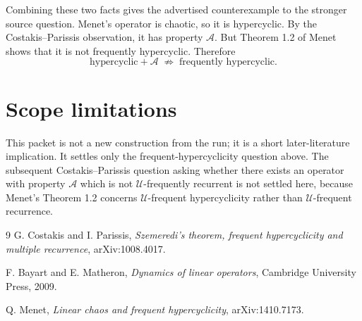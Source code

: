 \documentclass[11pt]{article}
\begin{document}
Combining these two facts gives the advertised counterexample to the stronger
source question. Menet's operator is chaotic, so it is hypercyclic. By the
Costakis--Parissis observation, it has property \(\mathcal A\). But Theorem
1.2 of Menet shows that it is not frequently hypercyclic. Therefore
\[
  \text{hypercyclic} + \mathcal A \;\not\Rightarrow\;
  \text{frequently hypercyclic}.
\]

\section*{Scope limitations}

This packet is not a new construction from the run; it is a short
later-literature implication. It settles only the frequent-hypercyclicity
question above. The subsequent Costakis--Parissis question asking whether
there exists an operator with property \(\mathcal A\) which is not
\(\mathcal U\)-frequently recurrent is not settled here, because Menet's
Theorem 1.2 concerns \(\mathcal U\)-frequent hypercyclicity rather than
\(\mathcal U\)-frequent recurrence.

\begin{thebibliography}{9}
G. Costakis and I. Parissis,
\emph{Szemeredi's theorem, frequent hypercyclicity and multiple recurrence},
arXiv:1008.4017.

F. Bayart and E. Matheron,
\emph{Dynamics of linear operators},
Cambridge University Press, 2009.

Q. Menet,
\emph{Linear chaos and frequent hypercyclicity},
arXiv:1410.7173.
\end{thebibliography}
\end{document}
